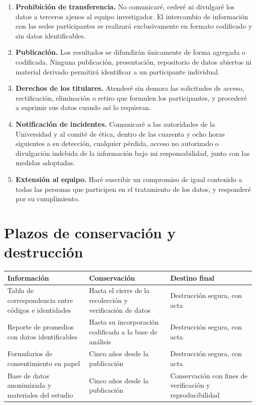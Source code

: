 \documentclass[10.5pt,a4paper]{article}
\begin{document}
\begin{enumerate}[label=\textbf{\arabic*.},leftmargin=0.9cm]
	\item \textbf{Prohibici\'on de transferencia.} No comunicar\'e, ceder\'e ni divulgar\'e los datos a terceros ajenos al equipo investigador. El intercambio de informaci\'on con las sedes participantes se realizar\'a exclusivamente en formato codificado y sin datos identificables.
	\item \textbf{Publicaci\'on.} Los resultados se difundir\'an \'unicamente de forma agregada o codificada. Ninguna publicaci\'on, presentaci\'on, repositorio de datos abiertos ni material derivado permitir\'a identificar a un participante individual.
	\item \textbf{Derechos de los titulares.} Atender\'e sin demora las solicitudes de acceso, rectificaci\'on, eliminaci\'on o retiro que formulen los participantes, y proceder\'e a suprimir sus datos cuando as\'i lo requieran.
	\item \textbf{Notificaci\'on de incidentes.} Comunicar\'e a las autoridades de la Universidad y al comit\'e de \'etica, dentro de las cuarenta y ocho horas siguientes a su detecci\'on, cualquier p\'erdida, acceso no autorizado o divulgaci\'on indebida de la informaci\'on bajo mi responsabilidad, junto con las medidas adoptadas.
	\item \textbf{Extensi\'on al equipo.} Har\'e suscribir un compromiso de igual contenido a todas las personas que participen en el tratamiento de los datos, y responder\'e por su cumplimiento.
\end{enumerate}

\section{Plazos de conservaci\'on y destrucci\'on}

\begin{table}[htbp]
	\centering
	\small
	\begin{tabular}{L{5.2cm} L{4.9cm} L{4.8cm}}
		\toprule
		\textbf{Informaci\'on} & \textbf{Conservaci\'on} & \textbf{Destino final} \\
		\midrule
		Tabla de correspondencia entre c\'odigos e identidades & Hasta el cierre de la recolecci\'on y verificaci\'on de datos & Destrucci\'on segura, con acta \\
		Reporte de promedios con datos identificables & Hasta su incorporaci\'on codificada a la base de an\'alisis & Destrucci\'on segura, con acta \\
		Formularios de consentimiento en papel & Cinco a\~nos desde la publicaci\'on & Destrucci\'on segura, con acta \\
		Base de datos anonimizada y materiales del estudio & Cinco a\~nos desde la publicaci\'on & Conservaci\'on con fines de verificaci\'on y reproducibilidad \\
		\bottomrule
	\end{tabular}
\end{table}
\end{document}
